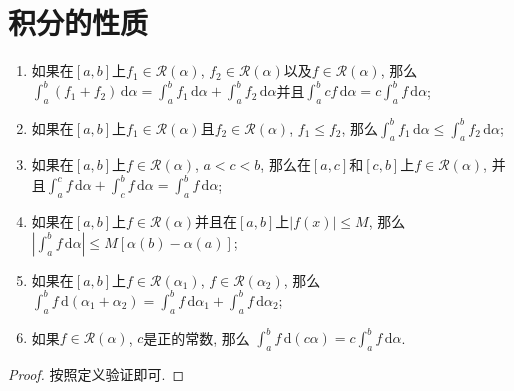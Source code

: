 \documentclass[cn,12pt,math=mtpro2,citestyle=gb7714-2015,bibstyle=gb7714-2015,twocol]{elegantbook}
\newcommand{\da}{\,\text{d}\alpha}
\begin{document}
\section{积分的性质}
\begin{theorem}\label{thm:th6.8}
  \begin{enumerate}[label=(\arabic*)]
  \item 如果在$[a,b]$上$f_1\in\mathscr{R}(\alpha)$, $f_2\in\mathscr{R}(\alpha)$以及$f\in\mathscr{R}(\alpha)$, 那么$\int_{a}^{b}(f_1+f_2)\da=\int_{a}^{b}f_1\da+\int_{a}^{b}f_2\da$并且$\int_{a}^{b}cf\da=c\int_{a}^{b}f\da$;


  \item 如果在$[a,b]$上$f_1\in\mathscr{R}(\alpha)$且$f_2\in\mathscr{R}(\alpha)$, $f_1\leq f_2$, 那么$\int_a^bf_1\da\leq\int_a^bf_2\da$;

  \item 如果在$[a,b]$上$f\in\mathscr{R}(\alpha)$, $a<c<b$, 那么在$[a,c]$和$[c,b]$上$f\in\mathscr{R}(\alpha)$, 并且$\int_{a}^{c}f\da+\int_{c}^{b}f\da=\int_{a}^{b}f\da$;

  \item 如果在$[a,b]$上$f\in\mathscr{R}(\alpha)$并且在$[a,b]$上$|f(x)|\leq M$, 那么
  $\left|\int_{a}^{b}f\da\right|\leq M[\alpha(b)-\alpha(a)]$;

  \item 如果在$[a,b]$上$f\in\mathscr{R}(\alpha_1)$, $f\in\mathscr{R}(\alpha_2)$, 那么
  $\int_{a}^{b}f\,\text{d}(\alpha_1+\alpha_2)=\int_{a}^{b}f\da_1+\int_{a}^{b}f\da_2$;

  \item 如果$f\in\mathscr{R}(\alpha)$, $c$是正的常数, 那么
  $\int_{a}^{b}f\,\text{d}(c\alpha)=c\int_{a}^{b}f\da$.
  \end{enumerate}
\end{theorem}
\begin{proof}
  按照定义验证即可.
\end{proof}
\end{document}
